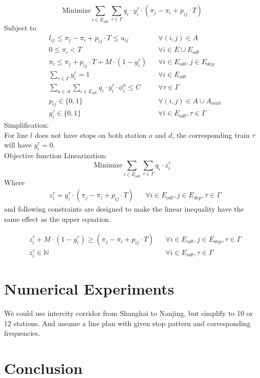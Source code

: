 \documentclass[titlepage,oneside,letterpage,12pt]{article}
\begin{document}
\begin{equation}\label{eq2}
\mathrm{Minimize} \sum_{ i\in E_{odt}} \sum_{\tau \in \varGamma} q_i\cdot y_i^{\tau} \cdot (\pi_j-\pi_i+p_{ij}\cdot T)
\end{equation}
Subject to
\begin{align}
& l_{ij}\leq \pi_j-\pi_i+ p_{ij}\cdot T \leq u_{ij} && \forall (i,j) \in A \label{eq3}\\
& 0\leq \pi_i < T && \forall i \in E \cup E_{odt} \label{eq4}\\
& \pi_i\leq \pi_j+p_{ij}\cdot T+M\cdot(1-y_i^\tau) &&\forall i \in E_{odt}, j \in E_{dep}\\
& \sum_{\tau \in \varGamma} y_i^{\tau}=1 && \forall i \in E_{odt}\\
& \sum_{a\in A} \sum_{i\in E_{odt}} q_i \cdot y_i^{\tau} \cdot \phi_i^a \leq C && \forall \tau \in \varGamma\\
& p_{ij} \in \{0,1\}&& \forall (i,j) \in A \cup A_{wait} \label{eq5}\\
&y_i^{\tau} \in \{0,1\}&& \forall i \in E_{odt}, \tau \in \varGamma \label{eq5}
\end{align}
Simplification:\\
For line $l$ does not have stops on both station $o$ and $d$, the corresponding train $\tau$ will have $y_i^{\tau}=0$.\\
Objective function Linearization:
\begin{equation}\label{eq2}
\mathrm{Minimize} \sum_{ i\in E_{odt}} \sum_{\tau \in \varGamma} q_i\cdot z_i^{\tau}
\end{equation}
Where
\begin{align}
&z_i^{\tau}= y_i^{\tau} \cdot(\pi_j-\pi_i+p_{ij}\cdot T) && \forall i \in E_{odt}, j \in E_{dep}, \tau \in \varGamma
\end{align}
and following constraints are designed to make the linear inequality have the same effect as the upper equation.

\begin{align}
&z_i^{\tau}+M \cdot (1-y_i^{\tau})\geq (\pi_j-\pi_i+p_{ij}\cdot T) && \forall i \in E_{odt}, j \in E_{dep}, \tau \in \varGamma\\
&z_i^{\tau}\in \mathbb{N} && \forall i \in E_{odt}, \tau \in \varGamma
\end{align}

\section{Numerical Experiments}
We could use intercity corridor from Shanghai to Nanjing, but simplify to 10 or 12 stations. And assume a line plan with given stop pattern and corresponding frequencies.

\section{Conclusion}


\newpage




\nolinenumbers
\end{document}
